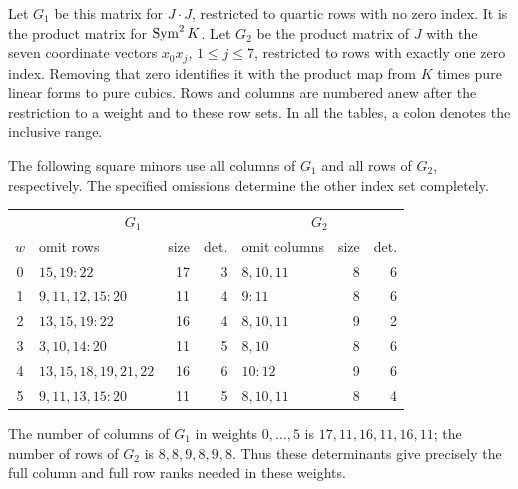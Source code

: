 Let $G_1$ be this matrix for $J\cdot J$, restricted to quartic rows
with no zero index.  It is the product matrix for $\operatorname{Sym}^2K$.
Let $G_2$ be the product matrix of $J$ with the seven coordinate
vectors $x_0x_j$, $1\le j\le7$, restricted to rows with exactly one
zero index.  Removing that zero identifies it with the product map
from $K$ times pure linear forms to pure cubics.  Rows and columns
are numbered anew after the restriction to a weight and to these
row sets.  In all the tables, a colon denotes the inclusive range.

The following square minors use all columns of $G_1$ and all rows of
$G_2$, respectively.  The specified omissions determine the other
index set completely.
\begin{center}
\small
\begin{tabular}{c l r r l r r}
\toprule
&\multicolumn{3}{c}{$G_1$}&\multicolumn{3}{c}{$G_2$}\\
$w$&omit rows&size&det.&omit columns&size&det.\\
\midrule
0&$15,19{:}22$&17&3&$8,10,11$&8&6\\
1&$9,11,12,15{:}20$&11&4&$9{:}11$&8&6\\
2&$13,15,19{:}22$&16&4&$8,10,11$&9&2\\
3&$3,10,14{:}20$&11&5&$8,10$&8&6\\
4&$13,15,18,19,21,22$&16&6&$10{:}12$&9&6\\
5&$9,11,13,15{:}20$&11&5&$8,10,11$&8&4\\
\bottomrule
\end{tabular}
\end{center}
The number of columns of $G_1$ in weights $0,\ldots,5$ is
$17,11,16,11,16,11$; the number of rows of $G_2$ is
$8,8,9,8,9,8$.  Thus these determinants give precisely the full
column and full row ranks needed in these weights.

